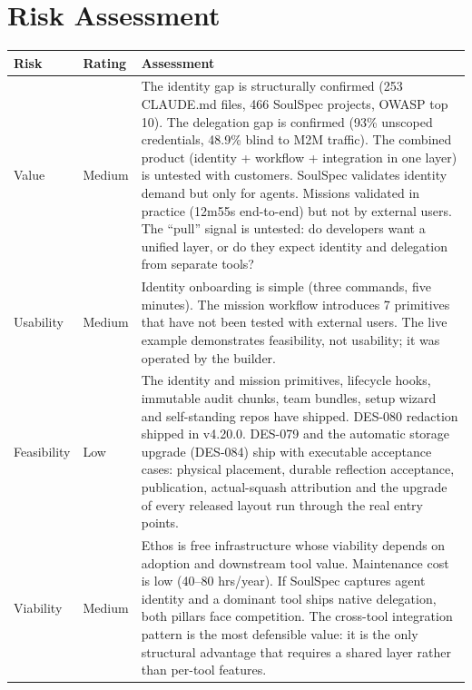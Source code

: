 \documentclass[11pt,letterpaper]{article}
\begin{document}
\newpage
\section*{Risk Assessment}

\renewcommand{\arraystretch}{1.6}
\begin{tabularx}{\textwidth}{@{} l l X @{}}
\toprule
\textbf{\color{SectionBlue}Risk} & \textbf{\color{SectionBlue}Rating} & \textbf{\color{SectionBlue}Assessment} \\
\midrule
Value      & \textcolor{RiskAmber}{Medium} & The identity gap is structurally confirmed (253 CLAUDE.md files, 466 SoulSpec projects, OWASP top 10). The delegation gap is confirmed (93\% unscoped credentials, 48.9\% blind to M2M traffic). The combined product (identity + workflow + integration in one layer) is untested with customers. SoulSpec validates identity demand but only for agents. Missions validated in practice (12m55s end-to-end) but not by external users. The ``pull'' signal is untested: do developers want a unified layer, or do they expect identity and delegation from separate tools? \\
Usability  & \textcolor{RiskAmber}{Medium} & Identity onboarding is simple (three commands, five minutes). The mission workflow introduces 7 primitives that have not been tested with external users. The live example demonstrates feasibility, not usability; it was operated by the builder. \\
Feasibility & \textcolor{RiskGreen}{Low} & The identity and mission primitives, lifecycle hooks, immutable audit chunks, team bundles, setup wizard and self-standing repos have shipped. DES-080 redaction shipped in v4.20.0. DES-079 and the automatic storage upgrade (DES-084) ship with executable acceptance cases: physical placement, durable reflection acceptance, publication, actual-squash attribution and the upgrade of every released layout run through the real entry points. \\
Viability  & \textcolor{RiskAmber}{Medium} & Ethos is free infrastructure whose viability depends on adoption and downstream tool value. Maintenance cost is low (40--80 hrs/year). If SoulSpec captures agent identity and a dominant tool ships native delegation, both pillars face competition. The cross-tool integration pattern is the most defensible value: it is the only structural advantage that requires a shared layer rather than per-tool features. \\
\bottomrule
\end{tabularx}
\renewcommand{\arraystretch}{1.0}
\end{document}
